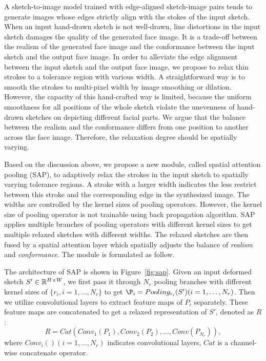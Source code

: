 
 
A sketch-to-image model trained with edge-aligned sketch-image pairs tends to generate images whose edges strictly align with the stokes of the input sketch.
When an input hand-drawn sketch is not well-drawn, line distortions in the input sketch damages the quality of the generated face image. 
It is a trade-off between the realism of the generated face image and the conformance between the input sketch and the output face image.
%
In order to alleviate the edge alignment between the input sketch and the output face image, we propose to relax thin strokes to a tolerance region with various width.
%
A straightforward way is to smooth the strokes to multi-pixel width by image smoothing or dilation. 
%
However, the capacity of this hand-crafted way is limited, because the uniform smoothness for all positions of the whole sketch violate the unevenness of hand-drawn sketches on depicting different facial parts. 
%
We argue that the balance between the realism and the conformance differs from one position to another across the face image. Therefore, the relaxation degree should be spatially varying. 


Based on the discussion above, we propose a new module, called spatial attention pooling (SAP), to adaptively relax the strokes in the input sketch to spatially varying tolerance regions. 
%
A stroke with a larger width indicates the less restrict between this stroke and the corresponding edge in the synthesized image. The widths are controlled by the kernel sizes of pooling operators. However, the kernel size of pooling operator is not trainable using back propagation algorithm. SAP applies multiple branches of pooling operators with different kernel sizes to get multiple relaxed sketches with different widths. The relaxed sketches are then fused by a spatial attention layer which spatially adjusts the balance of \textit{realism} and \textit{conformance}. The module is formulated as follow.

The architecture of SAP is shown in Figure~\ref{fig:sap}.
Given an input deformed sketch $S'\in {\mathbb{R}}^{H\times W}$, we first pass it through $N_r$ pooling branches with different kernel sizes of $\{r_i, i=1,\ldots, N_r\}$ to get $\P_{i}=Pooling_{r_i}(S') (i=1,\ldots,N_r)$. 
Then we utilize convolutional layers to extract feature maps of $P_i$ separately. These feature maps are concatenated to get a relaxed representation of $S'$, denoted as $R$:
%
\begin{equation}
R=Cat(Conv_1(P_1), Conv_2(P_2),..., Conv(P_{N_r})),
\end{equation}
where $Conv_i() (i=1,\ldots,N_r)$ indicates convolutional layers, $Cat$ is a channel-wise concatenate operator.

